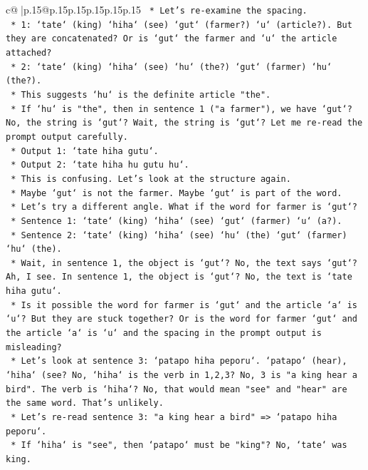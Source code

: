 \documentclass{article}
\begin{document}
{\begin{supertabular}{c@{$\;$}|p{.15\linewidth}@{}p{.15\linewidth}p{.15\linewidth}p{.15\linewidth}p{.15\linewidth}p{.15\linewidth}}
{{{\texttt{        *   Let's re{-}examine the spacing.} \\
\texttt{        *   1: `tate` (king) `hiha` (see) `gut` (farmer?) `u` (article?). But they are concatenated? Or is `gut` the farmer and `u` the article attached?} \\
\texttt{        *   2: `tate` (king) `hiha` (see) `hu` (the?) `gut` (farmer) `hu` (the?).} \\
\texttt{        *   This suggests `hu` is the definite article "the".} \\
\texttt{        *   If `hu` is "the", then in sentence 1 ("a farmer"), we have `gut`? No, the string is `gut`? Wait, the string is `gut`? Let me re{-}read the prompt output carefully.} \\
\texttt{        *   Output 1: `tate hiha gutu`.} \\
\texttt{        *   Output 2: `tate hiha hu gutu hu`.} \\
\texttt{        *   This is confusing. Let's look at the structure again.} \\
\texttt{        *   Maybe `gut` is not the farmer. Maybe `gut` is part of the word.} \\
\texttt{        *   Let's try a different angle. What if the word for farmer is `gut`?} \\
\texttt{        *   Sentence 1: `tate` (king) `hiha` (see) `gut` (farmer) `u` (a?).} \\
\texttt{        *   Sentence 2: `tate` (king) `hiha` (see) `hu` (the) `gut` (farmer) `hu` (the).} \\
\texttt{        *   Wait, in sentence 1, the object is `gut`? No, the text says `gut`? Ah, I see. In sentence 1, the object is `gut`? No, the text is `tate hiha gutu`.} \\
\texttt{        *   Is it possible the word for farmer is `gut` and the article `a` is `u`? But they are stuck together? Or is the word for farmer `gut` and the article `a` is `u` and the spacing in the prompt output is misleading?} \\
\texttt{        *   Let's look at sentence 3: `patapo hiha peporu`. `patapo` (hear), `hiha` (see? No, `hiha` is the verb in 1,2,3? No, 3 is "a king hear a bird". The verb is `hiha`? No, that would mean "see" and "hear" are the same word. That's unlikely.} \\
\texttt{        *   Let's re{-}read sentence 3: "a king hear a bird" => `patapo hiha peporu`.} \\
\texttt{        *   If `hiha` is "see", then `patapo` must be "king"? No, `tate` was king.} \\
}}}
\end{supertabular}}
\end{document}
